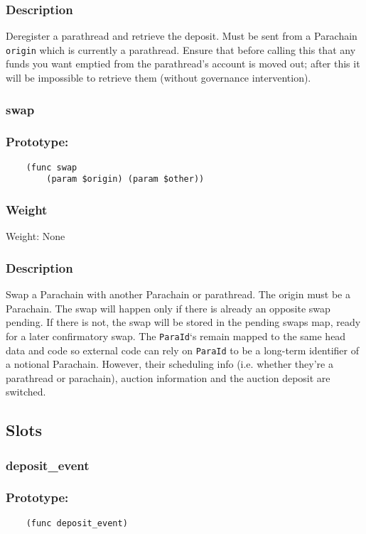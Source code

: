 \documentclass[11pt,a4paper]{article}
\begin{document}
\subsubsection*{Description}
Deregister a parathread and retrieve the deposit. Must be sent from a Parachain \verb|origin| which is currently a parathread. Ensure that before calling this that any funds you want emptied from the parathread's account is moved out; after this it will be impossible to retrieve them (without governance intervention).

\subsubsection{swap}
\subsubsection*{Prototype:}
\begin{verbatim}
    (func swap
        (param $origin) (param $other))
\end{verbatim}
\subsubsection*{Weight}
Weight: None
\subsubsection*{Description}
Swap a Parachain with another Parachain or parathread. The origin must be a Parachain. The swap will happen only if there is already an opposite swap pending. If there is not, the swap will be stored in the pending swaps map, ready for a later confirmatory swap.
The \verb|ParaId|`s remain mapped to the same head data and code so external code can rely on \verb|ParaId| to be a long-term identifier of a notional Parachain. However, their scheduling info (i.e. whether they're a parathread or parachain), auction information and the auction deposit are switched.

\subsection{Slots}
\subsubsection{deposit\_event}
\subsubsection*{Prototype:}
\begin{verbatim}
    (func deposit_event)
\end{verbatim}
\end{document}
